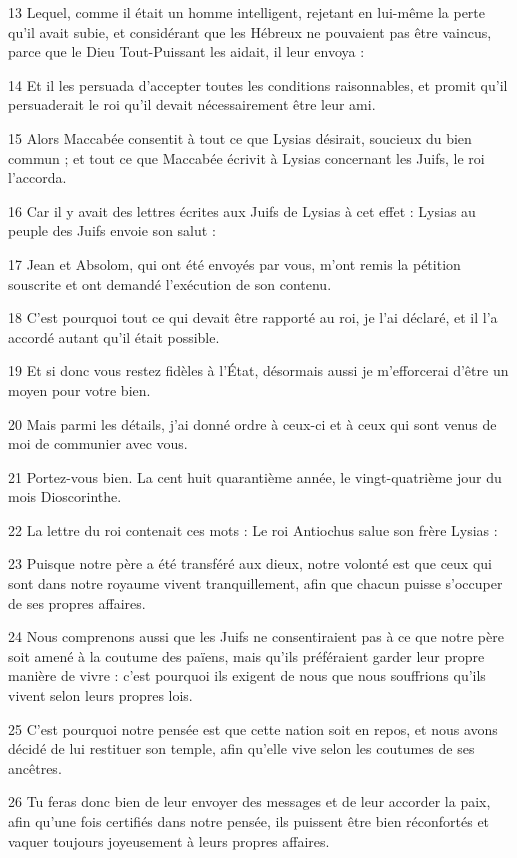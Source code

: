 \par 13 Lequel, comme il était un homme intelligent, rejetant en lui-même la perte qu'il avait subie, et considérant que les Hébreux ne pouvaient pas être vaincus, parce que le Dieu Tout-Puissant les aidait, il leur envoya :
\par 14 Et il les persuada d'accepter toutes les conditions raisonnables, et promit qu'il persuaderait le roi qu'il devait nécessairement être leur ami.
\par 15 Alors Maccabée consentit à tout ce que Lysias désirait, soucieux du bien commun ; et tout ce que Maccabée écrivit à Lysias concernant les Juifs, le roi l'accorda.
\par 16 Car il y avait des lettres écrites aux Juifs de Lysias à cet effet : Lysias au peuple des Juifs envoie son salut :
\par 17 Jean et Absolom, qui ont été envoyés par vous, m'ont remis la pétition souscrite et ont demandé l'exécution de son contenu.
\par 18 C'est pourquoi tout ce qui devait être rapporté au roi, je l'ai déclaré, et il l'a accordé autant qu'il était possible.
\par 19 Et si donc vous restez fidèles à l'État, désormais aussi je m'efforcerai d'être un moyen pour votre bien.
\par 20 Mais parmi les détails, j'ai donné ordre à ceux-ci et à ceux qui sont venus de moi de communier avec vous.
\par 21 Portez-vous bien. La cent huit quarantième année, le vingt-quatrième jour du mois Dioscorinthe.
\par 22 La lettre du roi contenait ces mots : Le roi Antiochus salue son frère Lysias :
\par 23 Puisque notre père a été transféré aux dieux, notre volonté est que ceux qui sont dans notre royaume vivent tranquillement, afin que chacun puisse s'occuper de ses propres affaires.
\par 24 Nous comprenons aussi que les Juifs ne consentiraient pas à ce que notre père soit amené à la coutume des païens, mais qu'ils préféraient garder leur propre manière de vivre : c'est pourquoi ils exigent de nous que nous souffrions qu'ils vivent selon leurs propres lois.
\par 25 C'est pourquoi notre pensée est que cette nation soit en repos, et nous avons décidé de lui restituer son temple, afin qu'elle vive selon les coutumes de ses ancêtres.
\par 26 Tu feras donc bien de leur envoyer des messages et de leur accorder la paix, afin qu'une fois certifiés dans notre pensée, ils puissent être bien réconfortés et vaquer toujours joyeusement à leurs propres affaires.
